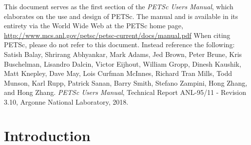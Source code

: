 

 This document serves as the first section of the {\em PETSc Users
Manual}, which elaborates on the use and design of PETSc. The
manual and is available in its entirety via the World Wide Web at
the PETSc home page,
\href{http://www.mcs.anl.gov/petsc/petsc-current/docs/manual.pdf}{http://www.mcs.anl.gov/petsc/petsc-current/docs/manual.pdf}
When citing PETSc, please do
not refer to this document. Instead reference the following: Satish
Balay, Shrirang Abhyankar, Mark Adams, Jed Brown, Peter Brune, Kris Buschelman, Lisandro Dalcin, Victor Eijhout, William Gropp, Dinesh Kaushik, Matt Knepley, Dave May,
Lois Curfman McInnes, Richard Tran Mills, Todd Munson, Karl Rupp, Patrick Sanan, Barry Smith, Stefano Zampini, Hong Zhang, and Hong Zhang.  {\em
PETSc Users Manual}, Technical Report ANL-95/11 - Revision 3.10,
Argonne National Laboratory, 2018.

%

\newpage
\section{Introduction}



